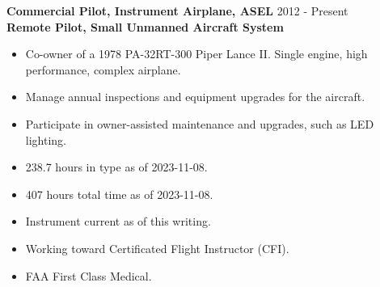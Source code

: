 \textbf{Commercial Pilot, Instrument Airplane, ASEL} \hfill 2012 - Present \\
\textbf{Remote Pilot, Small Unmanned Aircraft System}
\begin{itemize} \itemsep -2pt
\item Co-owner of a 1978 PA-32RT-300 Piper Lance II. Single engine, high performance, complex airplane.
\item Manage annual inspections and equipment upgrades for the aircraft.
\item Participate in owner-assisted maintenance and upgrades, such as LED lighting.
\item 238.7 hours in type as of 2023-11-08.
\item 407 hours total time as of 2023-11-08.
\item Instrument current as of this writing.
\item Working toward Certificated Flight Instructor (CFI).
\item FAA First Class Medical.

\end{itemize}
